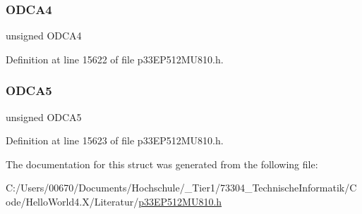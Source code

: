\subsubsection{\texorpdfstring{O\+D\+C\+A4}{ODCA4}}
{\footnotesize\ttfamily unsigned O\+D\+C\+A4}



Definition at line 15622 of file p33\+E\+P512\+M\+U810.\+h.

\mbox{\label{structtag_o_d_c_a_b_i_t_s_a92fe3798f3e46a011ac988294630bcc8}} 
\subsubsection{\texorpdfstring{O\+D\+C\+A5}{ODCA5}}
{\footnotesize\ttfamily unsigned O\+D\+C\+A5}



Definition at line 15623 of file p33\+E\+P512\+M\+U810.\+h.



The documentation for this struct was generated from the following file\+:\begin{DoxyCompactItemize}
\item 
C\+:/\+Users/00670/\+Documents/\+Hochschule/\+\_\+\+Tier1/73304\+\_\+\+Technische\+Informatik/\+Code/\+Hello\+World4.\+X/\+Literatur/\hyperlink{p33_e_p512_m_u810_8h}{p33\+E\+P512\+M\+U810.\+h}\end{DoxyCompactItemize}
